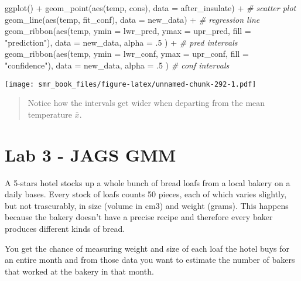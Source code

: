 \documentclass[
  oneside]{book}
\newenvironment{Shaded}{\begin{snugshade}}{\end{snugshade}}
\newcommand{\AttributeTok}[1]{\textcolor[rgb]{0.77,0.63,0.00}{#1}}
\newcommand{\CommentTok}[1]{\textcolor[rgb]{0.56,0.35,0.01}{\textit{#1}}}
\newcommand{\DecValTok}[1]{\textcolor[rgb]{0.00,0.00,0.81}{#1}}
\newcommand{\FunctionTok}[1]{\textcolor[rgb]{0.00,0.00,0.00}{#1}}
\newcommand{\NormalTok}[1]{#1}
\newcommand{\SpecialCharTok}[1]{\textcolor[rgb]{0.00,0.00,0.00}{#1}}
\newcommand{\StringTok}[1]{\textcolor[rgb]{0.31,0.60,0.02}{#1}}
\begin{document}
\begin{Shaded}
\begin{Highlighting}[]
\FunctionTok{ggplot}\NormalTok{() }\SpecialCharTok{+}
  \FunctionTok{geom\_point}\NormalTok{(}\FunctionTok{aes}\NormalTok{(temp, cons), }\AttributeTok{data =}\NormalTok{ after\_insulate) }\SpecialCharTok{+} \CommentTok{\# scatter plot}
  \FunctionTok{geom\_line}\NormalTok{(}\FunctionTok{aes}\NormalTok{(temp, fit\_conf), }\AttributeTok{data =}\NormalTok{ new\_data) }\SpecialCharTok{+} \CommentTok{\# regression line}
  \FunctionTok{geom\_ribbon}\NormalTok{(}\FunctionTok{aes}\NormalTok{(temp, }\AttributeTok{ymin =}\NormalTok{ lwr\_pred, }\AttributeTok{ymax =}\NormalTok{ upr\_pred, }\AttributeTok{fill =} \StringTok{"prediction"}\NormalTok{),}
    \AttributeTok{data =}\NormalTok{ new\_data, }\AttributeTok{alpha =}\NormalTok{ .}\DecValTok{5}
\NormalTok{  ) }\SpecialCharTok{+} \CommentTok{\# pred intervals}
  \FunctionTok{geom\_ribbon}\NormalTok{(}\FunctionTok{aes}\NormalTok{(temp, }\AttributeTok{ymin =}\NormalTok{ lwr\_conf, }\AttributeTok{ymax =}\NormalTok{ upr\_conf, }\AttributeTok{fill =} \StringTok{"confidence"}\NormalTok{),}
    \AttributeTok{data =}\NormalTok{ new\_data, }\AttributeTok{alpha =}\NormalTok{ .}\DecValTok{5}
\NormalTok{  ) }\CommentTok{\# conf intervals}
\end{Highlighting}
\end{Shaded}

\texttt{[image: smr\_book\_files/figure-latex/unnamed-chunk-292-1.pdf]}

\begin{quote}
Notice how the intervals get wider when departing from the mean temperature \(\bar x\).
\end{quote}

\hypertarget{lab-3---jags-gmm}{%
\chapter{Lab 3 - JAGS GMM}\label{lab-3---jags-gmm}}

A 5-stars hotel stocks up a whole bunch of bread loafs from a
local bakery on a daily bases. Every stock of loafs counts
50 pieces, each of which varies slightly, but not trascurably,
in size (volume in cm3) and weight (grams).
This happens because the bakery
doesn't have a precise recipe and therefore every baker
produces different kinds of bread.

You get the chance of measuring weight and size of each
loaf the hotel buys for an entire month and from those data
you want to estimate the number of bakers that worked at the
bakery in that month.
\end{document}
